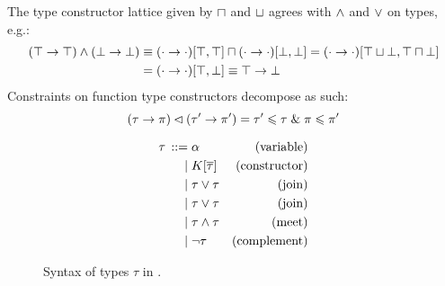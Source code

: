 \begin{example}
    The type constructor lattice given by $\sqcap$ and $\sqcup$ agrees with $\land$ and $\lor$ on types, e.g.:
    \begin{align*}
       (\top \to \top) \land (\bot \to \bot) 
       &\equiv (\cdot \to \cdot)[\top, \top] \sqcap (\cdot \to \cdot)[\bot, \bot] = (\cdot \to \cdot)[\top \sqcup \bot, \top \sqcap \bot] \\
       &= (\cdot \to \cdot)[\top, \bot] \equiv \top \to \bot 
    \end{align*}
    Constraints on function type constructors decompose as such:
    $$ (\tau \to \pi) \lhd (\tau' \to \pi') = \tau' \leqslant \tau \;\&\; \pi \leqslant \pi' $$
\end{example}

\begin{figure}
    \centering
    \begin{align*}
    {\tau} \,::=&\; 
             \alpha & \text{(variable)}
    \\ \mid&\; K[\overline \tau] & \text{(constructor)}
    \\ \mid&\; \tau \lor \tau & \text{(join)}
    \\ \mid&\; \tau \lor \tau & \text{(join)}
    \\ \mid&\; \tau \land \tau & \text{(meet)}
    \\ \mid&\; \lnot \tau & \text{(complement)}
    \end{align*}
    \caption{Syntax of types $\tau$ in \inference{}.}
    \label{fig:signature-types}
\end{figure}

